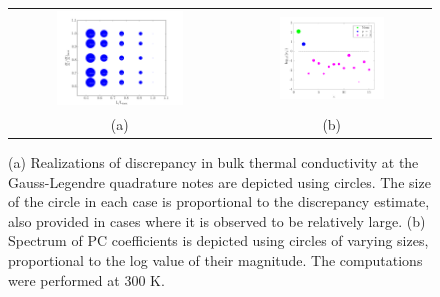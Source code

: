 \clearpage


\begin{figure}[p]
\begin{center}
\begin{tabular}{cc}
  \hspace{-12mm}
  \includegraphics[width=0.60\textwidth]{./Figures/realz_quad300K}
  &
  \hspace{-9mm}
  \includegraphics[width=0.56\textwidth]{./Figures/PCspectrum_300}
  \\ (a) & (b)
  \end{tabular}
\caption{(a) Realizations of discrepancy in bulk thermal conductivity at the Gauss-Legendre quadrature notes are
depicted using circles. The size of the circle in each case is proportional to the discrepancy estimate, also provided
 in cases where it is observed to be relatively large. (b) Spectrum of PC coefficients is depicted using circles of
 varying sizes, proportional to the log value of their magnitude. The computations were performed at 300 K.}
\label{fig:rs1}
\end{center}
\end{figure}

\clearpage


